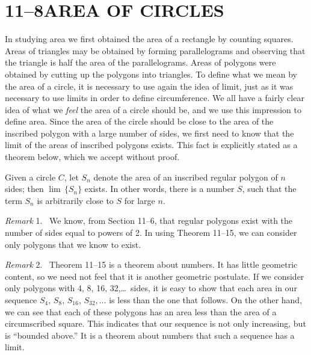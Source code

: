 \documentclass[11pt]{book}
\theoremstyle{bkplain}
\theoremstyle{XIplainnote}
\theoremstyle{bkplain}
\newenvironment{XIremarkn}[1]{\par\medskip\noindent\emph{Remark} #1.\ }%
  {\par\medskip}
\theoremstyle{bkplain}
\begin{document}
\section*{11--8\quad AREA OF CIRCLES}

In studying area we first obtained the area of a rectangle by counting squares.
Areas of triangles may be obtained by forming parallelograms and observing that
the triangle is half the area of the parallelograms. Areas of polygons were
obtained by cutting up the polygons into triangles. To define what we mean by
the area of a circle, it is necessary to use again the idea of limit, just as it
was necessary to use limits in order to define circumference. We all have a
fairly clear idea of what we \emph{feel} the area of a circle should be, and we
use this impression to define area. Since the area of the circle should be
close to the area of the inscribed polygon with a large number of sides, we
first need to know that the limit of the areas of inscribed polygons exists.
This fact is explicitly stated as a theorem below, which we accept without
proof.

\begin{theorem}
Given a circle $C$, let $S_n$ denote the area of an inscribed regular polygon
of $n$ sides; then $\lim\,\{S_n\}$ exists. In other words, there is a number
$S$, such that the term $S_n$ is arbitrarily close to $S$ for large $n$.
\end{theorem}

\begin{XIremarkn}{1}
We know, from Section 11--6, that regular polygons exist with the number of
sides equal to powers of 2. In using Theorem 11--15, we can consider only
polygons that we know to exist.
\end{XIremarkn}

\begin{XIremarkn}{2}
Theorem 11--15 is a theorem about numbers. It has little geometric content,
so we need not feel that it is another geometric postulate. If we consider only
polygons with 4, 8, 16, 32,\ldots\ sides, it is easy to show that each area in
our sequence $S_4$, $S_8$, $S_{16}$, $S_{32},\ldots$ is less than the one that
follows. On the other hand, we can see that each of these polygons has an area
less than the area of a circumscribed square. This indicates that our sequence
is not only increasing, but is ``bounded above.'' It is a theorem about numbers
that such a sequence has a limit.
\end{XIremarkn}
\end{document}
